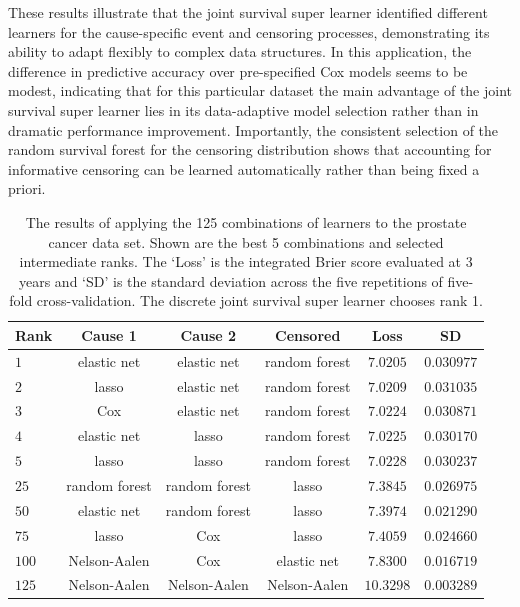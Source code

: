 \documentclass[alpha-refs]{wiley-article}
\newcommand{\1}{\mathbb{1}}
\begin{document}
These results illustrate that the joint survival super learner
identified different learners for the cause-specific event and
censoring processes, demonstrating its ability to adapt flexibly to
complex data structures. In this application, the difference in
predictive accuracy over pre-specified Cox models seems to be modest,
indicating that for this particular dataset the main advantage of the
joint survival super learner lies in its data-adaptive model selection
rather than in dramatic performance improvement. Importantly, the
consistent selection of the random survival forest for the censoring
distribution shows that accounting for informative censoring can be
learned automatically rather than being fixed a priori. 



\begin{table}[ht]
  \caption{The results of applying the 125 combinations of learners to
the prostate cancer data set. Shown are the best 5 combinations and
selected intermediate ranks.  The `Loss' is the integrated Brier
score evaluated at 3 years and `SD' is the standard deviation
across the five repetitions of five-fold cross-validation. The discrete
joint survival super learner chooses rank 1. }
\begin{center}  
\begin{tabular}{ l| c c c c c } 
  Rank&Cause 1&Cause 2&Censored&Loss&SD \\\hline
  $   1 $&elastic net&elastic net&random forest&$  7.0205 $&$ 0.030977 $ \\
  $   2 $&lasso&elastic net&random forest&$  7.0209 $&$ 0.031035 $ \\
  $   3 $&Cox&elastic net&random forest&$  7.0224 $&$ 0.030871 $ \\
  $   4 $&elastic net&lasso&random forest&$  7.0225 $&$ 0.030170 $ \\
  $   5 $&lasso&lasso&random forest&$  7.0228 $&$ 0.030237 $ \\
  $  25 $&random forest&random forest&lasso&$  7.3845 $&$ 0.026975 $ \\
  $  50 $&elastic net&random forest&lasso&$  7.3974 $&$ 0.021290 $ \\
  $  75 $&lasso&Cox&lasso&$  7.4059 $&$ 0.024660 $ \\
  $ 100 $&Nelson-Aalen&Cox&elastic net&$  7.8300 $&$ 0.016719 $ \\
  $ 125 $&Nelson-Aalen&Nelson-Aalen&Nelson-Aalen&$ 10.3298 $&$ 0.003289 $ \\
\end{tabular}\label{tab:1}
\end{center}
\end{table}
\end{document}
